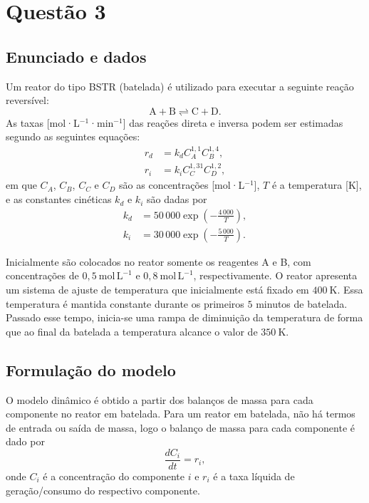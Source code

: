 \documentclass{article}
\begin{document}
\section{Questão 3}

\subsection*{Enunciado e dados}
Um reator do tipo BSTR (batelada) é utilizado para executar a seguinte reação reversível:
\begin{equation*}
  \mathrm{A} + \mathrm{B} \rightleftharpoons \mathrm{C} + \mathrm{D}.
\end{equation*}
As taxas [mol·L$^{-1}$·min$^{-1}$] das reações direta e inversa podem ser estimadas segundo as seguintes equações:
\begin{align}
  r_d &= k_d C_A^{1{,}1} C_B^{1{,}4}, \label{eq:rd-q3} \\
  r_i &= k_i C_C^{1{,}31} C_D^{1{,}2}, \label{eq:ri-q3}
\end{align}
em que $C_A$, $C_B$, $C_C$ e $C_D$ são as concentrações [mol·L$^{-1}$], $T$ é a temperatura [K], e as constantes cinéticas $k_d$ e $k_i$ são dadas por
\begin{align}
  k_d &= 50\,000 \exp\left(-\frac{4\,000}{T}\right), \label{eq:kd-q3} \\
  k_i &= 30\,000 \exp\left(-\frac{5\,000}{T}\right). \label{eq:ki-q3}
\end{align}

Inicialmente são colocados no reator somente os reagentes A e B, com concentrações de $0{,}5\ \mathrm{mol\,L^{-1}}$ e $0{,}8\ \mathrm{mol\,L^{-1}}$, respectivamente. O reator apresenta um sistema de ajuste de temperatura que inicialmente está fixado em $400\ \mathrm{K}$. Essa temperatura é mantida constante durante os primeiros $5$ minutos de batelada. Passado esse tempo, inicia-se uma rampa de diminuição da temperatura de forma que ao final da batelada a temperatura alcance o valor de $350\ \mathrm{K}$.

\subsection*{Formulação do modelo}

O modelo dinâmico é obtido a partir dos balanços de massa para cada componente no reator em batelada. Para um reator em batelada, não há termos de entrada ou saída de massa, logo o balanço de massa para cada componente é dado por
\begin{equation*}
  \frac{dC_i}{dt} = r_i,
\end{equation*}
onde $C_i$ é a concentração do componente $i$ e $r_i$ é a taxa líquida de geração/consumo do respectivo componente.
\end{document}
